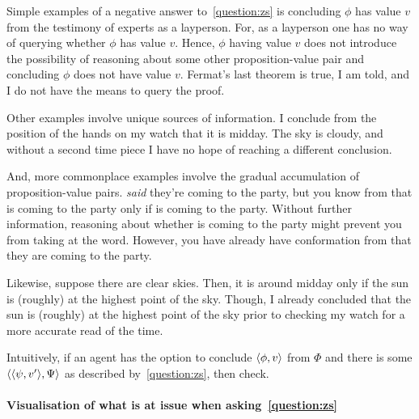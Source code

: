 \begin{note}[Success]
  Simple examples of a negative answer to~\ref{question:zs} is concluding \(\phi\) has value \(v\) from the testimony of experts as a layperson.
  For, as a layperson one has no way of querying whether \(\phi\) has value \(v\).
  Hence, \(\phi\) having value \(v\) does not introduce the possibility of reasoning about some other proposition-value pair and concluding \(\phi\) does not have value \(v\).
  Fermat's last theorem is true, I am told, and I do not have the means to query the proof.

  Other examples involve unique sources of information.
  I conclude from the position of the hands on my watch that it is midday.
  The sky is cloudy, and without a second time piece I have no hope of reaching a different conclusion.

  And, more commonplace examples involve the gradual accumulation of proposition-value pairs.
   \emph{said} they're coming to the party, but you know from  that  is coming to the party only if  is coming to the party.
  Without further information, reasoning about whether  is coming to the party might prevent you from taking  at the word.
  However, you have already have conformation from  that they are coming to the party.

  Likewise, suppose there are clear skies.
  Then, it is around midday only if the sun is (roughly) at the highest point of the sky.
  Though, I already concluded that the sun is (roughly) at the highest point of the sky prior to checking my watch for a more accurate read of the time.
\end{note}

\begin{note}
  Intuitively, if an agent has the option to conclude \(\langle \phi, v \rangle\) from \(\Phi\) and there is some \(\langle \langle \psi, v' \rangle, \Psi \rangle\) as described by~\autoref{question:zs}, then check.
\end{note}

\paragraph*{Visualisation of what is at issue when asking~\autoref{question:zs}}

